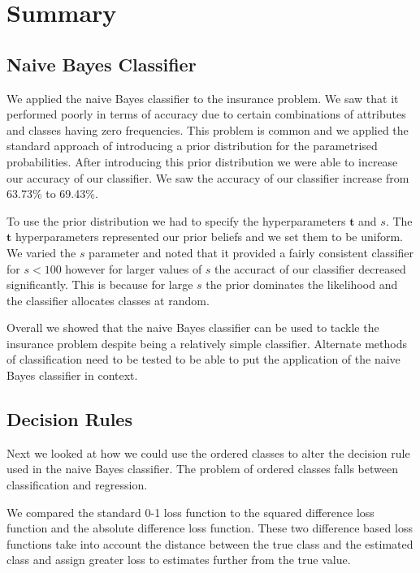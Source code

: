 \chapter{Summary}

\section{Naive Bayes Classifier}

We applied the naive Bayes classifier to the insurance problem.
We saw that it performed poorly in terms of accuracy due to certain combinations of attributes and classes having zero frequencies.
This problem is common and we applied the standard approach of introducing a prior distribution for the parametrised probabilities.
After introducing this prior distribution we were able to increase our accuracy of our classifier.
We saw the accuracy of our classifier increase from 63.73\% to 69.43\%.

To use the prior distribution we had to specify the hyperparameters $\mathbf{t}$ and $s$.
The $\mathbf{t}$ hyperparameters represented our prior beliefs and we set them to be uniform.
We varied the $s$ parameter and noted that it provided a fairly consistent classifier for $s<100$ however for larger values of $s$ the accuract of our classifier decreased significantly.
This is because for large $s$ the prior dominates the likelihood and the classifier allocates classes at random.

Overall we showed that the naive Bayes classifier can be used to tackle the insurance problem despite being a relatively simple classifier.
Alternate methods of classification need to be tested to be able to put the application of the naive Bayes classifier in context.

\section{Decision Rules}

Next we looked at how we could use the ordered classes to alter the decision rule used in the naive Bayes classifier.
The problem of ordered classes falls between classification and regression.

We compared the standard 0-1 loss function to the squared difference loss function and the absolute difference loss function. 
These two difference based loss functions take into account the distance between the true class and the estimated class and assign greater loss to estimates further from the true value.

